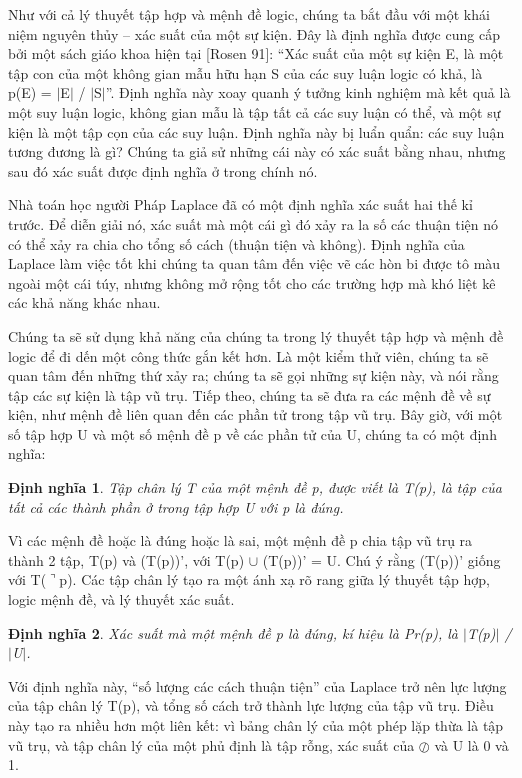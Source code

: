 \documentclass[11pt,a4paper,oneside]{article}
\newtheorem{modeling_def}{Định nghĩa }
\begin{document}
Như với cả lý thuyết tập hợp và mệnh đề logic, chúng ta bắt đầu với một khái niệm nguyên thủy – xác suất của một sự kiện. Đây là định nghĩa được cung cấp bởi một sách giáo khoa hiện tại [Rosen 91]: “Xác suất của một sự kiện E, là một tập con của một không gian mẫu hữu hạn S của các suy luận logic có khả, là p(E) = $\mid$E$\mid$ / $\mid$S$\mid$”. Định nghĩa này xoay quanh ý tưởng kinh nghiệm mà kết quả là một suy luận logic, không gian mẫu là tập tất cả các suy luận có thể, và một sự kiện là một tập cọn của các suy luận. Định nghĩa này bị luẩn quẩn: các suy luận tương đương là gì? Chúng ta giả sử những cái này có xác suất bằng nhau, nhưng sau đó xác suất được định nghĩa ở trong chính nó.

Nhà toán học người Pháp Laplace đã có một định nghĩa xác suất hai thế kỉ trước. Để diễn giải nó, xác suất mà một cái gì đó xảy ra la số các thuận tiện nó có thể xảy ra chia cho tổng số cách (thuận tiện và không). Định nghĩa của Laplace làm việc tốt khi chúng ta quan tâm đến việc vẽ các hòn bi được tô màu ngoài một cái túy, nhưng không mở rộng tốt cho các trường hợp mà khó liệt kê các khả năng khác nhau.

Chúng ta sẽ sử dụng khả năng của chúng ta trong lý thuyết tập hợp và mệnh đề logic để đi dến một công thức gắn kết hơn. Là một kiểm thử viên, chúng ta sẽ quan tâm đến những thứ xảy ra; chúng ta sẽ gọi những sự kiện này, và nói rằng tập các sự kiện là tập vũ trụ. Tiếp theo, chúng ta sẽ đưa ra các mệnh đề về sự kiện, như mệnh đề liên quan đến các phần tử trong tập vũ trụ. Bây giờ, với một số tập hợp U và một số mệnh đề p về các phần tử của U, chúng ta có một định nghĩa:

\begin{modeling_def}
Tập chân lý T của một mệnh đề p, được viết là T(p), là tập của tất cả các thành phần ở trong tập hợp U với p là đúng.
\end{modeling_def}

Vì các mệnh đề hoặc là đúng hoặc là sai, một mệnh đề p chia tập vũ trụ ra thành 2 tập, T(p) và (T(p))', với T(p) $\cup$ (T(p))' = U. Chú ý rằng (T(p))' giống với T($\urcorner$p). Các tập chân lý tạo ra một ánh xạ rõ rang giữa lý thuyết tập hợp, logic mệnh đề, và lý thuyết xác suất.

\begin{modeling_def}
Xác suất mà một mệnh đề p là đúng, kí hiệu là Pr(p), là $\mid$T(p)$\mid$ / $\mid$U$\mid$.
\end{modeling_def}

Với định nghĩa này, “số lượng các cách thuận tiện” của Laplace trở nên lực lượng của tập chân lý T(p), và tổng số cách trở thành lực lượng của tập vũ trụ. Điều này tạo ra nhiều hơn một liên kết: vì bảng chân lý của một phép lặp thừa là tập vũ trụ, và tập chân lý của một phủ định là tập rỗng, xác suất của $\oslash$ và U là 0 và 1.
\end{document}

